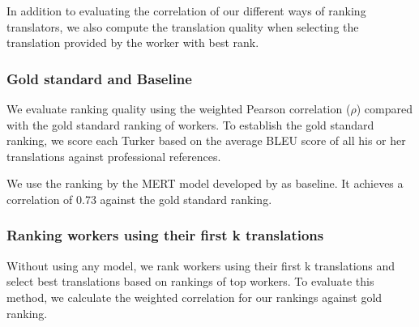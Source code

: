 In addition to evaluating the correlation of our different ways of ranking translators, we also compute the translation quality when selecting the translation provided by the worker with best rank.



\subsubsection{Gold standard and Baseline}
We evaluate ranking quality using the weighted Pearson correlation ($\rho$) compared with the gold standard ranking of workers. 
To establish the gold standard ranking, we score each Turker based on the average BLEU score of all his or her translations against professional references.

We use the ranking by the MERT model developed by  as baseline. It achieves a correlation of 0.73 against the gold standard ranking. 




\subsubsection{Ranking workers using their first k translations}
 Without using any model, we rank workers using their first k translations and select best translations based on rankings of top workers. To evaluate this method, we calculate the weighted correlation for our rankings against gold ranking. 

